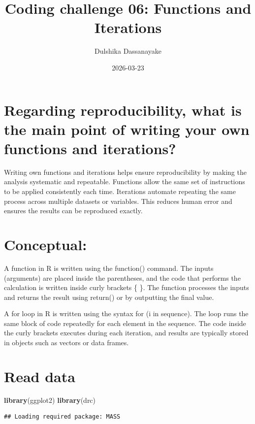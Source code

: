 \documentclass[
]{article}
\title{Coding challenge 06: Functions and Iterations}
\author{Dulshika Dassanayake}
\date{2026-03-23}
\newenvironment{Shaded}{\begin{snugshade}}{\end{snugshade}}
\newcommand{\FunctionTok}[1]{\textcolor[rgb]{0.13,0.29,0.53}{\textbf{#1}}}
\newcommand{\NormalTok}[1]{#1}
\begin{document}
\maketitle

{
\setcounter{tocdepth}{2}
\tableofcontents
}
\section{Regarding reproducibility, what is the main point of writing
your own functions and
iterations?}\label{regarding-reproducibility-what-is-the-main-point-of-writing-your-own-functions-and-iterations}

Writing own functions and iterations helps ensure reproducibility by
making the analysis systematic and repeatable. Functions allow the same
set of instructions to be applied consistently each time. Iterations
automate repeating the same process across multiple datasets or
variables. This reduces human error and ensures the results can be
reproduced exactly.

\section{Conceptual:}\label{conceptual}

A function in R is written using the function() command. The inputs
(arguments) are placed inside the parentheses, and the code that
performs the calculation is written inside curly brackets \{ \}. The
function processes the inputs and returns the result using return() or
by outputting the final value.

A for loop in R is written using the syntax for (i in sequence). The
loop runs the same block of code repeatedly for each element in the
sequence. The code inside the curly brackets executes during each
iteration, and results are typically stored in objects such as vectors
or data frames.

\section{Read data}\label{read-data}

\begin{Shaded}
\begin{Highlighting}[]
\FunctionTok{library}\NormalTok{(ggplot2)}
\FunctionTok{library}\NormalTok{(drc) }
\end{Highlighting}
\end{Shaded}

\begin{verbatim}
## Loading required package: MASS
\end{verbatim}
\end{document}
